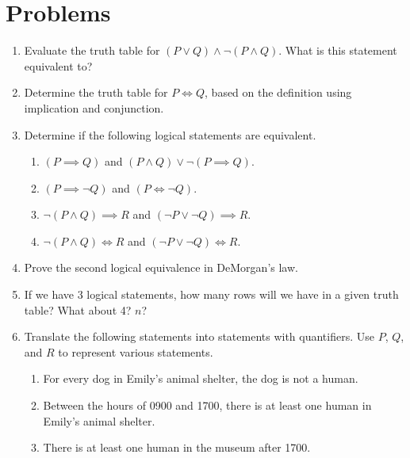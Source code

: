 \section*{Problems}
\begin{enumerate}
	\item Evaluate the truth table for $(P\lor Q)\land\neg(P\land Q)$. What is this statement equivalent to?\label{prob:xor}
	\item Determine the truth table for $P \iff Q$, based on the definition using implication and conjunction.
	\item Determine if the following logical statements are equivalent.
	      \begin{enumerate}
	      	\item $(P\implies Q)$ and $(P\land Q) \lor \neg(P\implies Q)$.
	        \item $(P\implies\neg Q)$ and $(P\iff\neg Q)$.
            \item $\neg(P\land Q)\implies R$ and $(\neg P\lor\neg Q)\implies R$.
            \item $\neg(P\land Q)\iff R$ and $(\neg P\lor\neg Q)\iff R$.
	      \end{enumerate}
	\item Prove the second logical equivalence in DeMorgan's law.\label{prob:demorgan}
	\item If we have 3 logical statements, how many rows will we have in a given truth table? What about 4? $n$?
    \item Translate the following statements into statements with quantifiers. Use $P$, $Q$, and $R$ to represent various statements.
    \begin{enumerate}
        \item For every dog in Emily's animal shelter, the dog is not a human.
        \item Between the hours of 0900 and 1700, there is at least one human in Emily's animal shelter.
        \item There is at least one human in the museum after 1700.
    \end{enumerate}
\end{enumerate}
